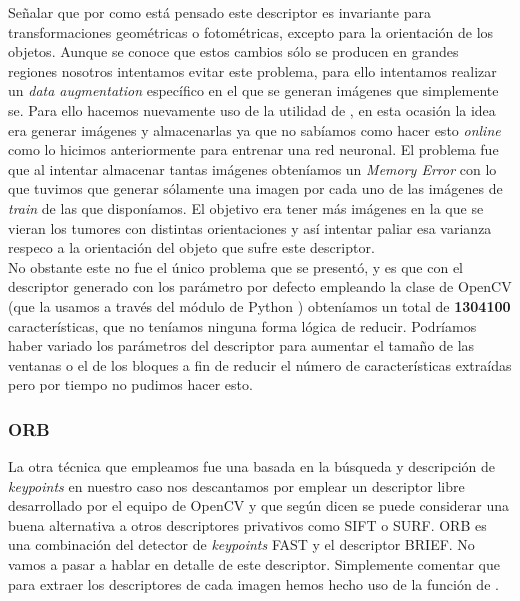 Señalar que por como está pensado este descriptor es invariante para transformaciones geométricas o fotométricas, excepto para la orientación de los objetos. Aunque se conoce que estos cambios sólo se producen en grandes regiones nosotros intentamos evitar este problema, para ello intentamos realizar un \textit{data augmentation} específico en el que se generan imágenes que simplemente se. Para ello hacemos nuevamente uso de la utilidad de  , en esta ocasión la idea era generar imágenes y almacenarlas ya que no sabíamos como hacer esto \textit{online} como lo hicimos anteriormente para entrenar una red neuronal. El problema fue que al intentar almacenar tantas imágenes obteníamos un \textit{Memory Error} con lo que tuvimos que generar sólamente una imagen por cada uno de las imágenes de \textit{train} de las que disponíamos. El objetivo era tener más imágenes en la que se vieran los tumores con distintas orientaciones y así intentar paliar esa varianza respeco a la orientación del objeto que sufre este descriptor.\\

No obstante este no fue el único problema que se presentó, y es que con el descriptor generado con los parámetro por defecto empleando la clase  de OpenCV (que la usamos a través del módulo de Python ) obteníamos un total de \textbf{1304100} características, que no teníamos ninguna forma lógica de reducir. Podríamos haber variado los parámetros del descriptor para aumentar el tamaño de las ventanas o el de los bloques a fin de reducir el número de características extraídas pero por tiempo no pudimos hacer esto.

\subsubsection{ORB}

La otra técnica que empleamos fue una basada en la búsqueda y descripción de \textit{keypoints} en nuestro caso nos descantamos por emplear  un descriptor libre desarrollado por el equipo de OpenCV y que según dicen se puede considerar una buena alternativa a otros descriptores privativos como SIFT o SURF.  ORB es una combinación del detector de \textit{keypoints} FAST y el descriptor BRIEF. No vamos a pasar a hablar en detalle de este descriptor. Simplemente comentar que para extraer los descriptores de cada imagen hemos hecho uso de la función  de .\\

